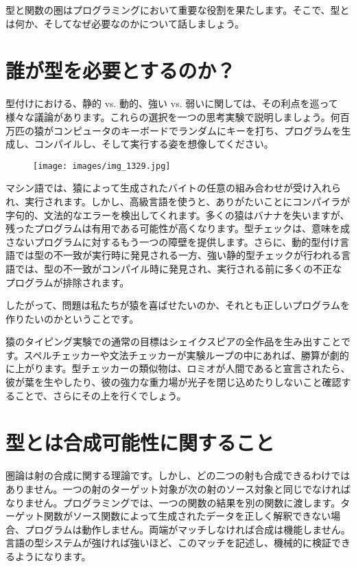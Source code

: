 
\lettrine[lhang=0.17]{型}{と関数}の圏はプログラミングにおいて重要な役割を果たします。そこで、型とは何か、そしてなぜ必要なのかについて話しましょう。

\section{誰が型を必要とするのか？}

型付けにおける、静的 vs. 動的、強い vs. 弱いに関しては、その利点を巡って様々な議論があります。これらの選択を一つの思考実験で説明しましょう。何百万匹の猿がコンピュータのキーボードでランダムにキーを打ち、プログラムを生成し、コンパイルし、そして実行する姿を想像してください。

\begin{figure}[H]
  \centering
  \texttt{[image: images/img\_1329.jpg]}
\end{figure}

\noindent
マシン語では、猿によって生成されたバイトの任意の組み合わせが受け入れられ、実行されます。しかし、高級言語を使うと、ありがたいことにコンパイラが字句的、文法的なエラーを検出してくれます。多くの猿はバナナを失いますが、残ったプログラムは有用である可能性が高くなります。型チェックは、意味を成さないプログラムに対するもう一つの障壁を提供します。さらに、動的型付け言語では型の不一致が実行時に発見される一方、強い静的型チェックが行われる言語では、型の不一致がコンパイル時に発見され、実行される前に多くの不正なプログラムが排除されます。

したがって、問題は私たちが猿を喜ばせたいのか、それとも正しいプログラムを作りたいのかということです。

猿のタイピング実験での通常の目標はシェイクスピアの全作品を生み出すことです。スペルチェッカーや文法チェッカーが実験ループの中にあれば、勝算が劇的に上がります。型チェッカーの類似物は、ロミオが人間であると宣言されたら、彼が葉を生やしたり、彼の強力な重力場が光子を閉じ込めたりしないこと確認することで、さらにその上を行くでしょう。

\section{型とは合成可能性に関すること}

圏論は射の合成に関する理論です。しかし、どの二つの射も合成できるわけではありません。一つの射のターゲット対象が次の射のソース対象と同じでなければなりません。プログラミングでは、一つの関数の結果を別の関数に渡します。ターゲット関数がソース関数によって生成されたデータを正しく解釈できない場合、プログラムは動作しません。両端がマッチしなければ合成は機能しません。言語の型システムが強ければ強いほど、このマッチを記述し、機械的に検証できるようになります。

